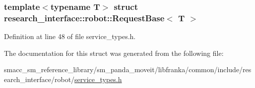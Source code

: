 \subsubsection*{template$<$typename T$>$\newline
struct research\+\_\+interface\+::robot\+::\+Request\+Base$<$ T $>$}



Definition at line 48 of file service\+\_\+types.\+h.



The documentation for this struct was generated from the following file\+:\begin{DoxyCompactItemize}
\item 
smacc\+\_\+sm\+\_\+reference\+\_\+library/sm\+\_\+panda\+\_\+moveit/libfranka/common/include/research\+\_\+interface/robot/\hyperlink{service__types_8h}{service\+\_\+types.\+h}\end{DoxyCompactItemize}
